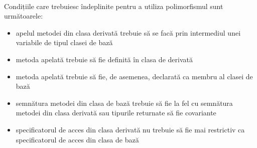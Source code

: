\paragraph{}Condițiile care trebuiesc îndeplinite pentru a utiliza polimorfismul sunt următoarele:\cite{14} 
\begin{itemize}
	\item apelul metodei din clasa derivată trebuie să se facă prin intermediul unei variabile de tipul clasei de bază
	\item metoda apelată trebuie să fie definită în clasa de derivată
	\item metoda apelată trebuie să fie, de asemenea, declarată ca membru al clasei de bază
	\item semnătura metodei din clasa de bază trebuie să fie la fel cu semnătura metodei din clasa derivată sau tipurile returnate să fie covariante
	\item specificatorul de acces din clasa derivată nu trebuie să fie mai restrictiv ca specificatorul de acces din clasa de bază
\end{itemize}
